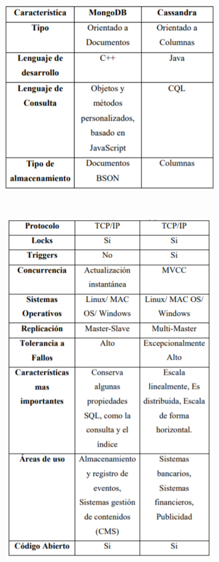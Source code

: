 \documentclass[12pt,a4paper,oneside]{book}
\begin{document}
\begin{enumerate}
\begin{enumerate}
				\begin{figure}[htb]
					\centering \includegraphics[width=12cm, height=12cm]{img/comparacion1.png}
				\end{figure}
			\newpage
				\begin{figure}[htb]
					\centering \includegraphics[width=12cm, height=18cm]{img/comparacion2.png}
				\end{figure}
		

\end{enumerate}
\end{enumerate}
\end{document}
